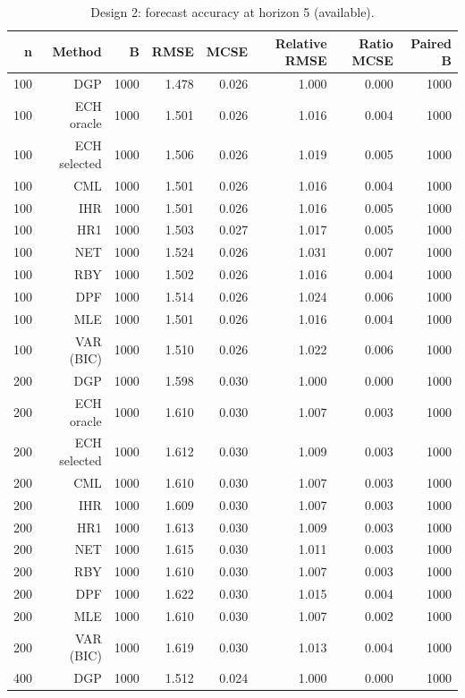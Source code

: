 \begin{table}[p]\centering
\caption{Design 2: forecast accuracy at horizon 5 (available).}
\small
\begin{tabular}{rrrrrrrr}\toprule
n & Method & B & RMSE & MCSE & Relative RMSE & Ratio MCSE & Paired B \\\midrule
100 & DGP & 1000 & 1.478 & 0.026 & 1.000 & 0.000 & 1000 \\
100 & ECH oracle & 1000 & 1.501 & 0.026 & 1.016 & 0.004 & 1000 \\
100 & ECH selected & 1000 & 1.506 & 0.026 & 1.019 & 0.005 & 1000 \\
100 & CML & 1000 & 1.501 & 0.026 & 1.016 & 0.004 & 1000 \\
100 & IHR & 1000 & 1.501 & 0.026 & 1.016 & 0.005 & 1000 \\
100 & HR1 & 1000 & 1.503 & 0.027 & 1.017 & 0.005 & 1000 \\
100 & NET & 1000 & 1.524 & 0.026 & 1.031 & 0.007 & 1000 \\
100 & RBY & 1000 & 1.502 & 0.026 & 1.016 & 0.004 & 1000 \\
100 & DPF & 1000 & 1.514 & 0.026 & 1.024 & 0.006 & 1000 \\
100 & MLE & 1000 & 1.501 & 0.026 & 1.016 & 0.004 & 1000 \\
100 & VAR (BIC) & 1000 & 1.510 & 0.026 & 1.022 & 0.006 & 1000 \\
200 & DGP & 1000 & 1.598 & 0.030 & 1.000 & 0.000 & 1000 \\
200 & ECH oracle & 1000 & 1.610 & 0.030 & 1.007 & 0.003 & 1000 \\
200 & ECH selected & 1000 & 1.612 & 0.030 & 1.009 & 0.003 & 1000 \\
200 & CML & 1000 & 1.610 & 0.030 & 1.007 & 0.003 & 1000 \\
200 & IHR & 1000 & 1.609 & 0.030 & 1.007 & 0.003 & 1000 \\
200 & HR1 & 1000 & 1.613 & 0.030 & 1.009 & 0.003 & 1000 \\
200 & NET & 1000 & 1.615 & 0.030 & 1.011 & 0.003 & 1000 \\
200 & RBY & 1000 & 1.610 & 0.030 & 1.007 & 0.003 & 1000 \\
200 & DPF & 1000 & 1.622 & 0.030 & 1.015 & 0.004 & 1000 \\
200 & MLE & 1000 & 1.610 & 0.030 & 1.007 & 0.002 & 1000 \\
200 & VAR (BIC) & 1000 & 1.619 & 0.030 & 1.013 & 0.004 & 1000 \\
400 & DGP & 1000 & 1.512 & 0.024 & 1.000 & 0.000 & 1000 \\

\end{tabular}
\end{table}
